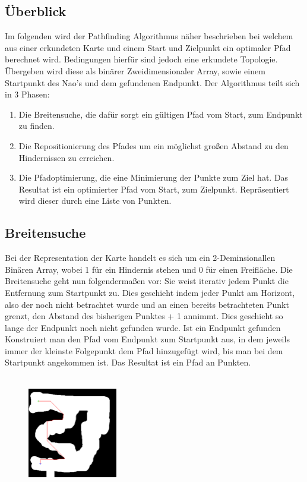\subsection*{Überblick}
	Im folgenden wird der Pathfinding Algorithmus näher beschrieben bei welchem aus einer erkundeten Karte und einem Start und Zielpunkt ein optimaler Pfad berechnet wird. Bedingungen hierfür sind jedoch eine erkundete Topologie. Übergeben wird diese als binärer Zweidimensionaler Array, sowie einem Startpunkt des Nao's und dem gefundenen Endpunkt. Der Algorithmus teilt sich in 3 Phasen: 
\begin{enumerate}
\item Die Breitensuche, die dafür sorgt ein gültigen Pfad vom Start, zum Endpunkt zu finden. 
\item Die Repositionierung des Pfades um ein möglichst großen Abstand zu den Hindernissen zu erreichen.
\item Die Pfadoptimierung, die eine Minimierung der Punkte zum Ziel hat. Das Resultat ist ein optimierter Pfad vom Start, zum Zielpunkt. Repräsentiert wird dieser durch eine Liste von Punkten.
\end{enumerate}

\subsection*{Breitensuche}
	Bei der Representation der Karte handelt es sich um ein 2-Deminsionallen Binären Array, wobei 1 für ein Hindernis stehen und 0 für einen Freifläche. Die Breitensuche geht nun folgendermaßen vor: Sie weist iterativ jedem Punkt die Entfernung zum Startpunkt zu. Dies geschieht indem jeder Punkt am Horizont, also der noch nicht betrachtet wurde und an einen bereits betrachteten Punkt grenzt, den Abstand des bisherigen Punktes + 1 annimmt. Dies geschieht so lange der Endpunkt noch nicht gefunden wurde. Ist ein Endpunkt gefunden Konstruiert man den Pfad vom Endpunkt zum Startpunkt aus, in dem jeweils immer der kleinste Folgepunkt dem Pfad hinzugefügt wird, bis man bei dem Startpunkt angekommen ist. Das Resultat ist ein Pfad an Punkten.\\
	\\

\begin{figure}[ht]
    \centering
	\includegraphics[width=0.35\textwidth, angle=0]{img/p2.png} 
\end{figure}
